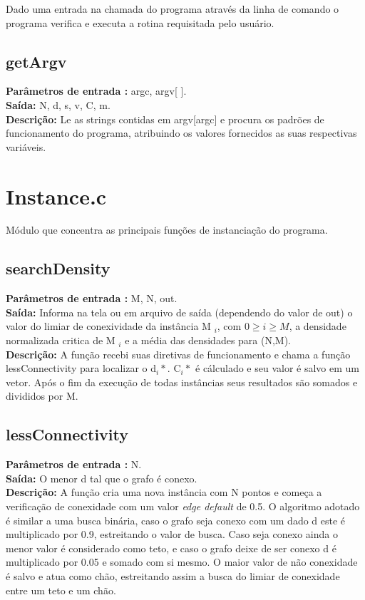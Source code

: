 \documentclass[a4paper,11pt]{article}
\begin{document}
Dado uma entrada na chamada do programa através da linha de comando o programa verifica e executa a rotina requisitada pelo usuário.

\subsection{getArgv}

\textbf{Parâmetros de entrada :} argc, argv[ ]. \\
\textbf{Saída:} N, d, s, v, C, m.\\

\textbf{Descrição:}
Le as strings contidas em argv[argc] e procura os padrões de funcionamento do programa, atribuindo os valores fornecidos as suas respectivas variáveis.

\section{Instance.c}
Módulo que concentra as principais funções de instanciação do programa.

\subsection{searchDensity}
\textbf{Parâmetros de entrada :} M, N, out. \\
\textbf{Saída:} Informa na tela ou em arquivo de saída (dependendo do valor de out) o valor do limiar de conexividade da instância M $_i$, com $ 0 \ge i \ge M $, a densidade normalizada critica de M $_i$ e a média das densidades para (N,M).\\

\textbf{Descrição:}
A função recebi suas diretivas de funcionamento e chama a função lessConnectivity para localizar o d$_i*$. C$_i*$ é cálculado e seu valor é salvo em um vetor. Após o fim da execução de todas instâncias seus resultados são somados e divididos por M.

\subsection{lessConnectivity}
\textbf{Parâmetros de entrada :} N. \\
\textbf{Saída:} O menor d tal que o grafo é conexo.\\

\textbf{Descrição:}
A função cria uma nova instância com N pontos e começa a verificação de conexidade com um valor \textit{edge default} de 0.5. O algoritmo adotado é similar a uma busca binária, caso o grafo seja conexo com um dado d este é multiplicado por 0.9, estreitando o valor de busca. Caso seja conexo ainda o menor valor é considerado como teto, e caso o grafo deixe de ser conexo d é multiplicado por 0.05 e somado com si mesmo. O maior valor de não conexidade é salvo e atua como chão, estreitando assim a busca do limiar de conexidade entre um teto e um chão.
\end{document}
